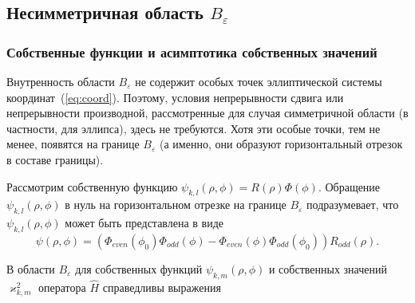 \subsection{Несимметричная область $B_\varepsilon$}\label{sec:ch2/sec2/sub2}
\subsubsection{Собственные функции и асимптотика собственных значений}\label{sec:ch2/sec2/sub2/sub1}


Внутренность области $B_\varepsilon$ не содержит особых точек эллиптической системы координат~(\ref{eq:coord}). Поэтому, условия непрерывности сдвига или непрерывности производной, рассмотренные для случая симметричной области (в частности, для эллипса), здесь не требуются.
Хотя эти особые точки, тем не менее, появятся на границе  $B_\varepsilon$ (а именно, они образуют горизонтальный отрезок в составе границы).

Рассмотрим собственную функцию $\psi_{k,l}(\rho,\phi) = R(\rho)\Phi(\phi)$.
Обращение  $\psi_{k,l}(\rho,\phi) $ в нуль на горизонтальном отрезке на границе  $B_\varepsilon$
подразумевает, что $\psi_{k,l}(\rho,\phi)$ может быть представлена в виде
\[
\psi(\rho,\phi) = 
    \left(
    \Phi_{even}(\phi_0) \Phi_{odd}(\phi) - \Phi_{even}(\phi) \Phi_{odd}(\phi_0) 
    \right) R_{odd}(\rho).
\]

В области  $B_\varepsilon$ для собственных функций $\psi_{k, m}(\rho, \phi)$ и собственных значений $\varkappa^2_{k, m}$ оператора $\hat{H}$ справедливы выражения

